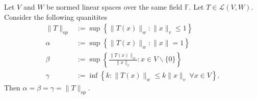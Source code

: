 \begin{prop}
    Let $V$ and $W$ be normed linear spaces over the same field $\mathbb{F}$. Let $T\in \mathscr{L}(V,W)$. Consider the following quanitites 
    $$\begin{aligned}
        \|T\|_{op}&:=\sup\left\{\|T(x)\|_{w} : \|x\|_{v}\leq 1\right\}\\
        \alpha&:=\sup\left\{\|T(x)\|_{w}:\|x\|=1\right\}\\
        \beta&:=\sup\left\{\frac{\|T(x)\|_{w}}{\|x\|_{v}}:x\in V\backslash\{0\}\right\}\\
        \gamma&:=\inf\left\{k:\|T(x)\|_{w}\leq k\|x\|_{v}~\forall x\in V\right\}.
    \end{aligned}$$
    Then $\alpha=\beta=\gamma=\|T\|_{op}$.
\end{prop}

